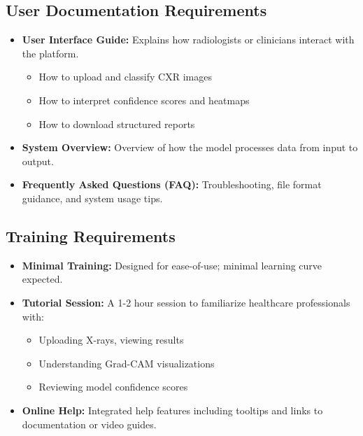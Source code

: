 \documentclass[12pt]{article}
\begin{document}
\subsection{User Documentation Requirements}
\begin{itemize}
    \item \textbf{User Interface Guide:} Explains how radiologists or clinicians interact with the platform.
    \begin{itemize}
        \item How to upload and classify CXR images
        \item How to interpret confidence scores and heatmaps
        \item How to download structured reports
    \end{itemize}
    \item \textbf{System Overview:} Overview of how the model processes data from input to output.
    \item \textbf{Frequently Asked Questions (FAQ):} Troubleshooting, file format guidance, and system usage tips.
\end{itemize}

\subsection{Training Requirements}
\begin{itemize}
    \item \textbf{Minimal Training:} Designed for ease-of-use; minimal learning curve expected.
    \item \textbf{Tutorial Session:} A 1-2 hour session to familiarize healthcare professionals with:
    \begin{itemize}
        \item Uploading X-rays, viewing results
        \item Understanding Grad-CAM visualizations
        \item Reviewing model confidence scores
    \end{itemize}
    \item \textbf{Online Help:} Integrated help features including tooltips and links to documentation or video guides.
\end{itemize}
\end{document}
